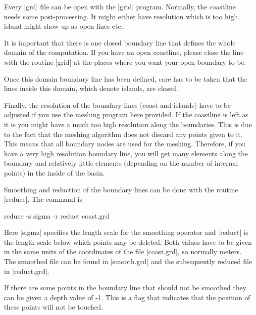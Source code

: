 
%
%
%
%
%
%
%

Every |grd| file can be open with the |grid| program.
Normally, the coastline needs some post-processing.
It might either have resolution which is too high, island
might show up as open lines etc..

It is important that there is one closed boundary line that
defines the whole domain of the computation. If you have an
open coastline, please close the line with the routine |grid|
at the places where you want your open boundary to be.

Once this domain boundary line has been defined, care has
to be taken that the lines inside this domain, which denote
islands, are closed.

Finally, the resolution of the boundary lines (coast and islands)
have to be adjusted if you use the meshing program here provided. 
If the coastline is left as it is you might
have a much too high resolution along the boundaries. This is due
to the fact that the meshing algorithm does not discard any points
given to it. This means that all boundary nodes are used for the meshing.
Therefore, if you have a very high resolution boundary line, you will
get many elements along the boundary and relatively little elements
(depending on the number of internal points) in the inside of the
basin.

Smoothing and reduction of the boundary lines can be done with the
routine |reduce|. The command is

\begin{code}
    reduce -s sigma -r reduct coast.grd
\end{code}

Here |sigma| specifies the length scale for the smoothing operator
and |reduct| is the length scale below which points may be deleted.
Both values have to be given in the same units of the coordinates
of the file |coast.grd|, so normally meters.
The smoothed file can be found in |smooth.grd| and the subsequently
reduced file in |reduct.grd|. 

If there are some points in the boundary line that should not be smoothed
they can be given a depth value of -1. This is a flag that indicates
that the position of these points will not be touched.


